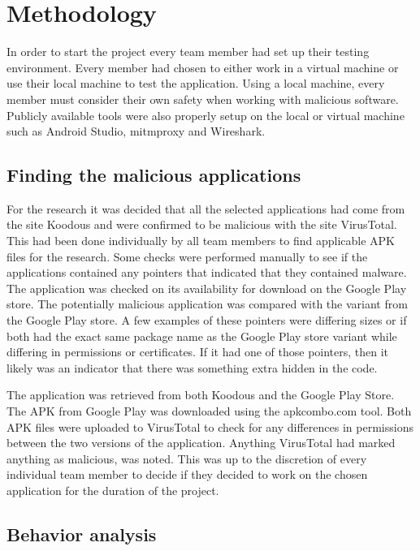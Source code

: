 \section{Methodology}

In order to start the project every team member had set up their testing environment.
Every member had chosen to either work in a virtual machine or use their local machine to test the application.
Using a local machine, every member must consider their own safety when working with malicious software.
Publicly available tools were also properly setup on the local or virtual machine such as Android Studio, mitmproxy and Wireshark.

\subsection{Finding the malicious applications}

For the research it was decided that all the selected applications had come from the site Koodous and were confirmed to be malicious with the site VirusTotal.
This had been done individually by all team members to find applicable APK files for the research.
Some checks were performed manually to see if the applications contained any pointers that indicated that they contained malware.
The application was checked on its availability for download on the Google Play store.
The potentially malicious application was compared with the variant from the Google Play store.
A few examples of these pointers were differing sizes or if both had the exact same package name as the Google Play store variant while differing in permissions or certificates.
If it had one of those pointers, then it likely was an indicator that there was something extra hidden in the code.

The application was retrieved from both Koodous and the Google Play Store.
The APK from Google Play was downloaded using the apkcombo.com tool.
Both APK files were uploaded to VirusTotal to check for any differences in permissions between the two versions of the application.
Anything VirusTotal had marked anything as malicious, was noted.
This was up to the discretion of every individual team member to decide if they decided to work on the chosen application for the duration of the project.

\subsection{Behavior analysis}

